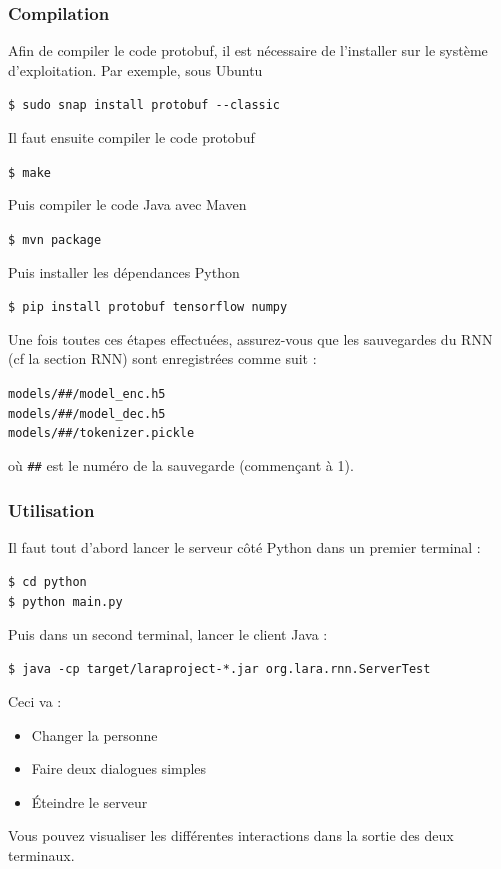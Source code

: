 \documentclass[10pt,a4paper]{article}
\begin{document}
\subsubsection{Compilation}
Afin de compiler le code protobuf, il est nécessaire de l'installer sur le système d'exploitation. Par exemple, sous Ubuntu
\begin{center}
	\texttt{\$ sudo snap install protobuf -{}-classic}
\end{center}
Il faut ensuite compiler le code protobuf
\begin{center}
	\texttt{\$ make}
\end{center}
Puis compiler le code Java avec Maven
\begin{center}
	\texttt{\$ mvn package}
\end{center}
Puis installer les dépendances Python
\begin{center}
	\texttt{\$ pip install protobuf tensorflow numpy}
\end{center}
Une fois toutes ces étapes effectuées, assurez-vous que les sauvegardes du RNN (cf la section RNN) sont enregistrées comme suit :
\begin{center}
	\texttt{models/\#\#/model\_enc.h5} \\
	\texttt{models/\#\#/model\_dec.h5} \\
	\texttt{models/\#\#/tokenizer.pickle}
\end{center}
où \texttt{\#\#} est le numéro de la sauvegarde (commençant à 1).
\subsubsection{Utilisation}
Il faut tout d'abord lancer le serveur côté Python dans un premier terminal :
\begin{center}
	\texttt{\$ cd python} \\
	\texttt{\$ python main.py}
\end{center}
Puis dans un second terminal, lancer le client Java :
\begin{center}
	\texttt{\$ java -cp target/laraproject-*.jar org.lara.rnn.ServerTest}
\end{center}
Ceci va :
\begin{itemize}
	\item Changer la personne
	\item Faire deux dialogues simples
	\item Éteindre le serveur
\end{itemize}
Vous pouvez visualiser les différentes interactions dans la sortie des deux terminaux.
\end{document}
